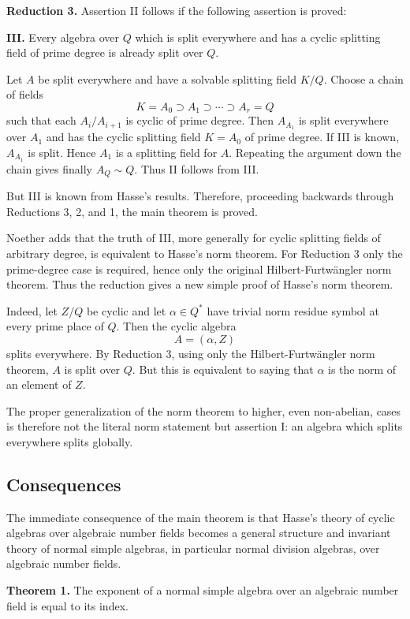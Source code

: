 \documentclass[
  11pt,
]{article}
\begin{document}
\textbf{Reduction 3.} Assertion II follows if the following assertion is
proved:

\textbf{III.} Every algebra over \(Q\) which is split everywhere and has
a cyclic splitting field of prime degree is already split over \(Q\).

Let \(A\) be split everywhere and have a solvable splitting field
\(K/Q\). Choose a chain of fields \[
  K=A_0\supset A_1\supset\cdots\supset A_r=Q
\] such that each \(A_i/A_{i+1}\) is cyclic of prime degree. Then
\(A_{A_1}\) is split everywhere over \(A_1\) and has the cyclic
splitting field \(K=A_0\) of prime degree. If III is known, \(A_{A_1}\)
is split. Hence \(A_1\) is a splitting field for \(A\). Repeating the
argument down the chain gives finally \(A_Q\sim Q\). Thus II follows
from III.

But III is known from Hasse's results. Therefore, proceeding backwards
through Reductions 3, 2, and 1, the main theorem is proved.

Noether adds that the truth of III, more generally for cyclic splitting
fields of arbitrary degree, is equivalent to Hasse's norm theorem. For
Reduction 3 only the prime-degree case is required, hence only the
original Hilbert-Furtwängler norm theorem. Thus the reduction gives a
new simple proof of Hasse's norm theorem.

Indeed, let \(Z/Q\) be cyclic and let \(\alpha\in Q^*\) have trivial
norm residue symbol at every prime place of \(Q\). Then the cyclic
algebra \[
  A=(\alpha,Z)
\] splits everywhere. By Reduction 3, using only the Hilbert-Furtwängler
norm theorem, \(A\) is split over \(Q\). But this is equivalent to
saying that \(\alpha\) is the norm of an element of \(Z\).

The proper generalization of the norm theorem to higher, even
non-abelian, cases is therefore not the literal norm statement but
assertion I: an algebra which splits everywhere splits globally.

\subsection{Consequences}\label{consequences}

The immediate consequence of the main theorem is that Hasse's theory of
cyclic algebras over algebraic number fields becomes a general structure
and invariant theory of normal simple algebras, in particular normal
division algebras, over algebraic number fields.

\textbf{Theorem 1.} The exponent of a normal simple algebra over an
algebraic number field is equal to its index.
\end{document}
